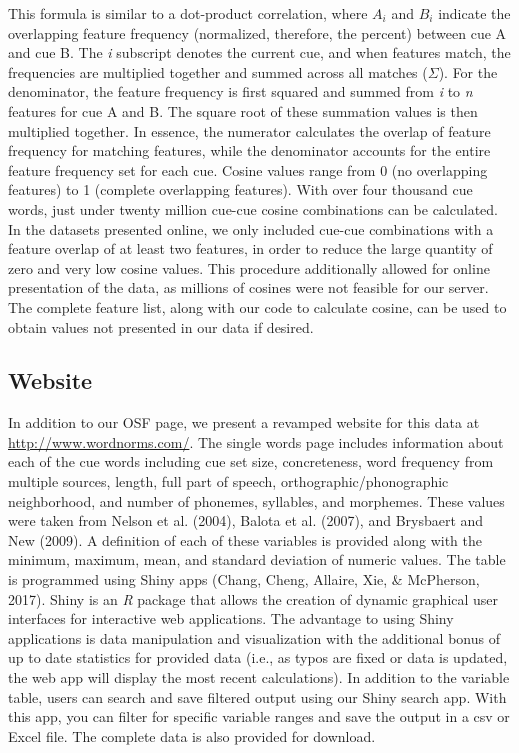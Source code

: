 \documentclass[english,,man]{apa6}
\theoremstyle{definition}
\theoremstyle{definition}
\theoremstyle{definition}
\theoremstyle{remark}
\begin{document}
This formula is similar to a dot-product correlation, where \(A_i\) and
\(B_i\) indicate the overlapping feature frequency (normalized,
therefore, the percent) between cue A and cue B. The \emph{i} subscript
denotes the current cue, and when features match, the frequencies are
multiplied together and summed across all matches (\(\Sigma\)). For the
denominator, the feature frequency is first squared and summed from
\emph{i} to \emph{n} features for cue A and B. The square root of these
summation values is then multiplied together. In essence, the numerator
calculates the overlap of feature frequency for matching features, while
the denominator accounts for the entire feature frequency set for each
cue. Cosine values range from 0 (no overlapping features) to 1 (complete
overlapping features). With over four thousand cue words, just under
twenty million cue-cue cosine combinations can be calculated. In the
datasets presented online, we only included cue-cue combinations with a
feature overlap of at least two features, in order to reduce the large
quantity of zero and very low cosine values. This procedure additionally
allowed for online presentation of the data, as millions of cosines were
not feasible for our server. The complete feature list, along with our
code to calculate cosine, can be used to obtain values not presented in
our data if desired.

\subsection{Website}\label{website}

In addition to our OSF page, we present a revamped website for this data
at \url{http://www.wordnorms.com/}. The single words page includes
information about each of the cue words including cue set size,
concreteness, word frequency from multiple sources, length, full part of
speech, orthographic/phonographic neighborhood, and number of phonemes,
syllables, and morphemes. These values were taken from Nelson et al.
(2004), Balota et al. (2007), and Brysbaert and New (2009). A definition
of each of these variables is provided along with the minimum, maximum,
mean, and standard deviation of numeric values. The table is programmed
using Shiny apps (Chang, Cheng, Allaire, Xie, \& McPherson, 2017). Shiny
is an \emph{R} package that allows the creation of dynamic graphical
user interfaces for interactive web applications. The advantage to using
Shiny applications is data manipulation and visualization with the
additional bonus of up to date statistics for provided data (i.e., as
typos are fixed or data is updated, the web app will display the most
recent calculations). In addition to the variable table, users can
search and save filtered output using our Shiny search app. With this
app, you can filter for specific variable ranges and save the output in
a csv or Excel file. The complete data is also provided for download.
\end{document}

